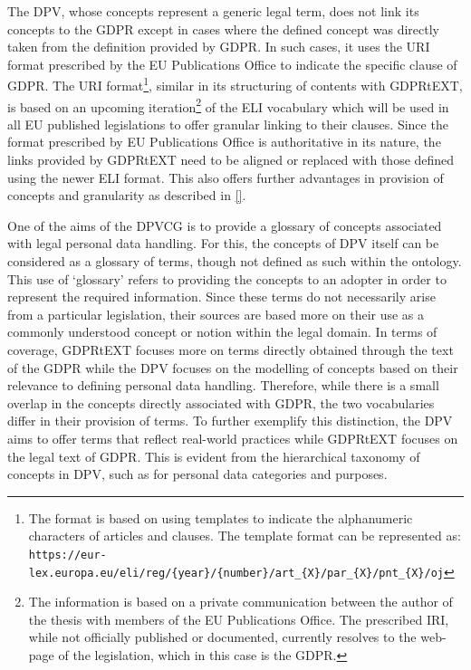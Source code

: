 The DPV, whose concepts represent a generic legal term, does not link its concepts to the GDPR except in cases where the defined concept was directly taken from the definition provided by GDPR.
In such cases, it uses the URI format prescribed by the EU Publications Office to indicate the specific clause of GDPR. The URI format\footnote{The format is based on using templates to indicate the alphanumeric characters of articles and clauses. The template format can be represented as: \texttt{https://eur-lex.europa.eu/eli/reg/\{year\}/\{number\}/art\_\{X\}/par\_\{X\}/pnt\_\{X\}/oj}}, similar in its structuring of contents with GDPRtEXT, is based on an upcoming iteration\footnote{The information is based on a private communication between the author of the thesis with members of the EU Publications Office. The prescribed IRI, while not officially published or documented, currently resolves to the web-page of the legislation, which in this case is the GDPR.} of the ELI vocabulary which will be used in all EU published legislations to offer granular linking to their clauses.
Since the format prescribed by EU Publications Office is authoritative in its nature, the links provided by GDPRtEXT need to be aligned or replaced with those defined using the newer ELI format.
This also offers further advantages in provision of concepts and granularity as described in \autoref{}.

One of the aims of the DPVCG is to provide a glossary of concepts associated with legal personal data handling. For this, the concepts of DPV itself can be considered as a glossary of terms, though not defined as such within the ontology. This use of `glossary' refers to providing the concepts to an adopter in order to represent the required information. Since these terms do not necessarily arise from a particular legislation, their sources are based more on their use as a commonly understood concept or notion within the legal domain.
In terms of coverage, GDPRtEXT focuses more on terms directly obtained through the text of the GDPR while the DPV focuses on the modelling of concepts based on their relevance to defining personal data handling.
Therefore, while there is a small overlap in the concepts directly associated with GDPR, the two vocabularies differ in their provision of terms. To further exemplify this distinction, the DPV aims to offer terms that reflect real-world practices while GDPRtEXT focuses on the legal text of GDPR. This is evident from the hierarchical taxonomy of concepts in DPV, such as for personal data categories and purposes.

